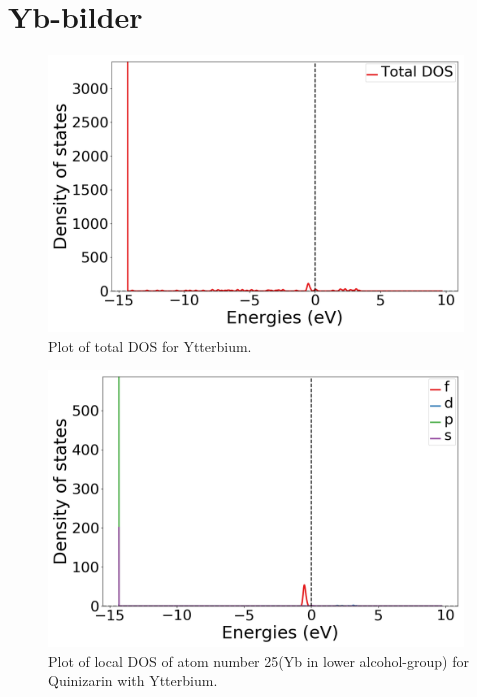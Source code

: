 \documentclass{article}
\begin{document}
\vspace{1cm}

\section{Yb-bilder}

  \begin{figure}[H]
      \centering
      \includegraphics[width = 11cm]{../fig/Yb_TDOS_1.png}
      \caption{Plot of total DOS for Ytterbium. }
      \label{fig:Yb_TDOS_1}
  \end{figure}

  \begin{figure}[H]
      \centering
      \includegraphics[width = 11cm]{../fig/Yb_LDOS25_1.png}
      \caption{Plot of local DOS of atom number 25(Yb in lower alcohol-group) for Quinizarin with Ytterbium. }
      \label{fig:Yb_LDOS25_1}
  \end{figure}
\end{document}
